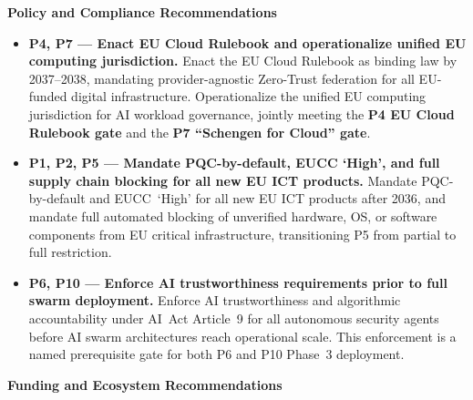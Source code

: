 \documentclass{ieeeaccess}
\begin{document}
\textbf{Policy and Compliance Recommendations}

\begin{itemize}

    \item \textbf{P4, P7 --- Enact EU Cloud Rulebook and operationalize
    unified EU computing jurisdiction.}
    Enact the EU Cloud Rulebook as binding law by 2037--2038, mandating
    provider-agnostic Zero-Trust federation for all EU-funded digital
    infrastructure. Operationalize the unified EU computing jurisdiction
    for AI workload governance, jointly meeting the
    \textbf{P4 EU Cloud Rulebook gate} and the
    \textbf{P7 ``Schengen for Cloud'' gate}.

    \item \textbf{P1, P2, P5 --- Mandate PQC-by-default, EUCC `High',
    and full supply chain blocking for all new EU ICT products.}
    Mandate PQC-by-default and EUCC~`High' for all new EU ICT products
    after 2036, and mandate full automated blocking of unverified
    hardware, OS, or software components from EU critical
    infrastructure, transitioning P5 from partial to full restriction.

    \item \textbf{P6, P10 --- Enforce AI trustworthiness requirements
    prior to full swarm deployment.}
    Enforce AI trustworthiness and algorithmic accountability under
    AI~Act Article~9 for all autonomous security agents before AI
    swarm architectures reach operational scale. This enforcement is
    a named prerequisite gate for both P6 and P10 Phase~3 deployment.

\end{itemize}

\textbf{Funding and Ecosystem Recommendations}
\end{document}
